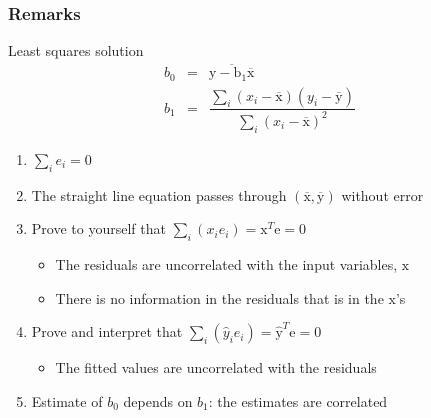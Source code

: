 \begin{frame}\frametitle{Remarks}
	\begin{block}{Least squares solution} 
		$$ 
			\begin{array}{rcl}
				b_0 &=& \overline{\mathrm{y - b_1\overline{\mathrm{x}}}} \\
				b_1 &=& \dfrac{ \sum_i{\left(x_i - \overline{\mathrm{x}}\right)\left(y_i - \overline{\mathrm{y}}\right) } }{ \sum_i{\left( x_i - \overline{\mathrm{x}}\right)^2} } 
			\end{array}
		$$ 
	\end{block}
	\begin{enumerate}
		\item	$\sum_i{e_i} = 0$ 
		\item	The straight line equation passes through $(\overline{\mathrm{x}}, \overline{\mathrm{y}})$ without error 
		\item	Prove to yourself that $\sum_i{(x_i e_i)} = \mathrm{x}^T\mathrm{e} = 0$ 
		\begin{itemize}
			\item	The residuals are uncorrelated with the input variables, $\mathrm{x}$ 
			\item	There is no information in the residuals that is in the $\mathrm{x}$'s 
		\end{itemize}
		\item	Prove and interpret that $\sum_i{(\hat{y}_i e_i)} = \hat{\mathrm{y}}^T\mathrm{e} = 0$ 
		\begin{itemize}
			\item	The fitted values are uncorrelated with the residuals 
		\end{itemize}
		\item	Estimate of $b_0$ depends on $b_1$: the estimates are correlated 
	\end{enumerate}
\end{frame}

